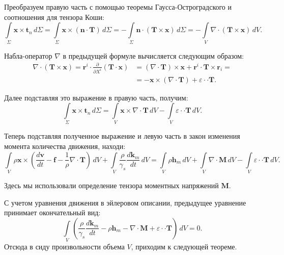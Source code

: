 Преобразуем правую часть с помощью теоремы Гаусса-Остроградского и соотношения для тензора Коши:
\begin{equation*}
	\int\limits_{\Sigma} \mathbf{x} \times \mathbf{t}_n \, d\Sigma = \int\limits_{\Sigma} \mathbf{x} \times \left(\mathbf{n} \cdot \mathbf{T}\right) \, d\Sigma = - \int\limits_{\Sigma} \mathbf{n} \cdot \left(\mathbf{T} \times \mathbf{x}\right) \, d\Sigma = - \int\limits_{V} \nabla \cdot \left(\mathbf{T} \times \mathbf{x}\right) \, dV.
\end{equation*}

Набла-оператор $\nabla$ в предыдущей формуле вычисляется следующим образом:
\begin{align*}
	\nabla \cdot \left(\mathbf{T} \times \mathbf{x}\right) = \mathbf{r}^i \cdot \frac{\partial}{\partial X^i} \left(\mathbf{T} \cdot \mathbf{x}\right) &= \left(\nabla \cdot \mathbf{T}\right) \times \mathbf{x} + \mathbf{r}^i \cdot \mathbf{T} \times \mathbf{r}_i = \\
	&= - \mathbf{x} \times \left(\nabla \cdot \mathbf{T}\right) + \varepsilon \cdot \cdot \mathbf{T}.
\end{align*}

Далее подставляя это выражение в правую часть, получим: 
\begin{equation*}
	\int\limits_{\Sigma} \mathbf{x} \times \mathbf{t}_n \, d\Sigma = \int\limits_{V} \mathbf{x} \times \nabla \cdot \mathbf{T} \, dV - \int\limits_{V} \varepsilon \cdot \cdot \mathbf{T} \, dV.
\end{equation*}

Теперь подставляя полученное выражение и левую часть в закон изменения момента количества движения, находи:
\begin{equation*}
	\int\limits_{V} \rho \mathbf{x} \times \left(\frac{d\mathbf{v}}{dt} - \mathbf{f} - \frac{1}{\rho} \nabla \cdot \mathbf{T}\right) \, dV + \int\limits_{V} \frac{\rho}{\gamma_s} \frac{d\mathbf{k}_m}{dt} \, dV = \int\limits_{V} \rho \mathbf{h}_m \, dV + \int\limits_{V}\nabla \cdot \mathbf{M} \, dV - \int\limits_{V} \varepsilon \cdot \cdot \mathbf{T} \, dV.
\end{equation*}

Здесь мы использовали определение тензора моментных напряжений $\mathbf{M}$. 

С учетом уравнения движения в эйлеровом описании, предыдущее уравнение принимает окончательный вид:
\begin{equation*}
	\int\limits_{V} \left(\frac{\rho}{\gamma_s} \frac{d\mathbf{k}_m}{dt} - \rho \mathbf{h}_m - \nabla \cdot \mathbf{M} + \varepsilon \cdot \cdot \mathbf{T}\right) \, dV = 0.
\end{equation*}
Отсюда в сиду произвольности объема $V$, приходим к следующей теореме.

